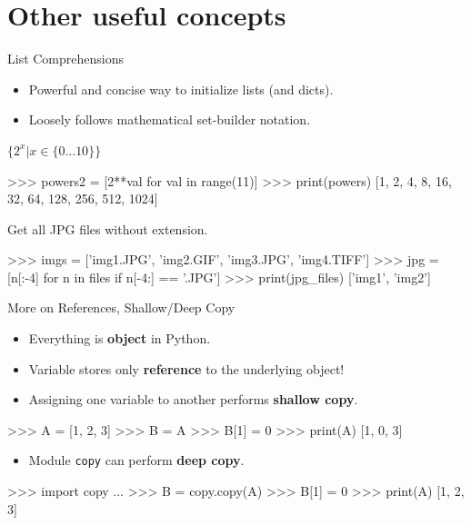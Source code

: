 \documentclass[10pt]{beamer}
\begin{document}
\section{Other useful concepts}


\begin{frame}[fragile]{List Comprehensions}

	\begin{itemize}
	\item \pause Powerful and concise way to initialize lists (and dicts).
	\item \pause Loosely follows mathematical set-builder notation.
	\end{itemize}
	
	$\{2^{x} | x \in \{0 ... 10\} \}$
	\begin{pythoncode}
		>>> powers2 = [2**val for val in range(11)]
		>>> print(powers)
		[1, 2, 4, 8, 16, 32, 64, 128, 256, 512, 1024]
	\end{pythoncode}

	Get all JPG files without extension.
	\begin{pythoncode}
		>>> imgs = ['img1.JPG', 'img2.GIF', 'img3.JPG', 'img4.TIFF']
		>>> jpg = [n[:-4] for n in files if n[-4:] == '.JPG']
		>>> print(jpg_files)
		['img1', 'img2']
	\end{pythoncode}

\end{frame}

\begin{frame}[fragile]{More on References, Shallow/Deep Copy}

    \begin{itemize}
        \item \pause Everything is \textbf{object} in Python.
        \item \pause Variable stores only \textbf{reference} to the underlying object!
        \item \pause Assigning one variable to another performs \textbf{shallow copy}.
    \end{itemize}

    \pause
    \begin{pythoncode}
        >>> A = [1, 2, 3]
        >>> B = A
        >>> B[1] = 0
        >>> print(A)
        [1, 0, 3]
    \end{pythoncode}

    \begin{itemize}
        \item \pause Module \small{\texttt{copy}} can perform \textbf{deep copy}.
    \end{itemize}
    \begin{pythoncode}
        >>> import copy
        ...
        >>> B = copy.copy(A)
        >>> B[1] = 0
        >>> print(A)
        [1, 2, 3]
    \end{pythoncode}
\end{frame}
\end{document}
